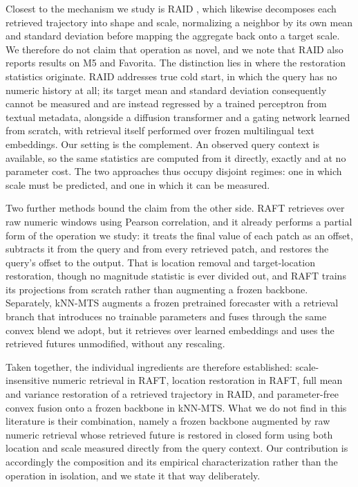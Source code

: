 \documentclass[twocolumn]{svjour3}          %
\begin{document}
Closest to the mechanism we study is RAID \cite{raid}, which likewise decomposes each retrieved trajectory into shape and scale, normalizing a neighbor by its own mean and standard deviation before mapping the aggregate back onto a target scale. We therefore do not claim that operation as novel, and we note that RAID also reports results on M5 and Favorita. The distinction lies in where the restoration statistics originate. RAID addresses true cold start, in which the query has no numeric history at all; its target mean and standard deviation consequently cannot be measured and are instead regressed by a trained perceptron from textual metadata, alongside a diffusion transformer and a gating network learned from scratch, with retrieval itself performed over frozen multilingual text embeddings. Our setting is the complement. An observed query context is available, so the same statistics are computed from it directly, exactly and at no parameter cost. The two approaches thus occupy disjoint regimes: one in which scale must be predicted, and one in which it can be measured.

Two further methods bound the claim from the other side. RAFT \cite{raft} retrieves over raw numeric windows using Pearson correlation, and it already performs a partial form of the operation we study: it treats the final value of each patch as an offset, subtracts it from the query and from every retrieved patch, and restores the query's offset to the output. That is location removal and target-location restoration, though no magnitude statistic is ever divided out, and RAFT trains its projections from scratch rather than augmenting a frozen backbone. Separately, kNN-MTS \cite{knnmts} augments a frozen pretrained forecaster with a retrieval branch that introduces no trainable parameters and fuses through the same convex blend we adopt, but it retrieves over learned embeddings and uses the retrieved futures unmodified, without any rescaling.

Taken together, the individual ingredients are therefore established: scale-insensitive numeric retrieval in RAFT, location restoration in RAFT, full mean and variance restoration of a retrieved trajectory in RAID, and parameter-free convex fusion onto a frozen backbone in kNN-MTS. What we do not find in this literature is their combination, namely a frozen backbone augmented by raw numeric retrieval whose retrieved future is restored in closed form using both location and scale measured directly from the query context. Our contribution is accordingly the composition and its empirical characterization rather than the operation in isolation, and we state it that way deliberately.
\end{document}
